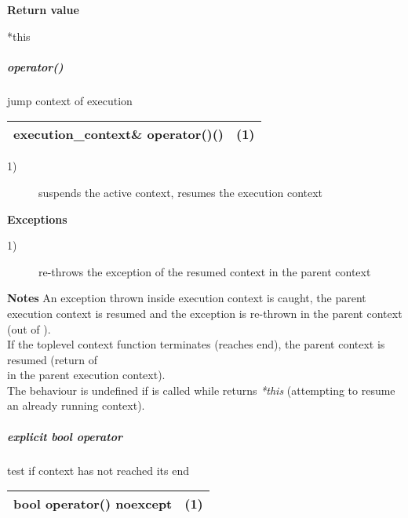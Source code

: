{\bfseries Return value}
\begin{description}
    \item[*this]
\end{description}

\subparagraph*{operator()}
jump context of execution\\

\begin{tabular}{ l l }
    \midrule

    {\ttfamily\small\color{black}execution\_context\& {\color{blue}operator}()()} & (1)\\

    \midrule
\end{tabular}

\begin{description}
    \item[1)] suspends the active context, resumes the execution context\\
\end{description}

{\bfseries Exceptions}
\begin{description}
    \item[1)] re-throws the exception of the resumed context in the parent context\\
\end{description}

{\bfseries Notes}
\newline
An exception thrown inside execution context is caught, the parent execution
context is resumed and the exception is re-thrown in the parent context (out of
\ectxop).\\
If the toplevel context function terminates (reaches end), the parent context is
resumed (return of\\
\ectxop in the parent execution context).\\
The behaviour is undefined if  is called while 
returns \emph{*this} (attempting to resume an already running context).

\subparagraph*{explicit bool operator}
test if context has not reached its end\\

\begin{tabular}{ l l }
    \midrule

    {\ttfamily\small\color{black}{\color{blue}explicit} {\color{blue}bool} {\color{blue}operator}() {\color{blue}noexcept}} & (1)\\

    \midrule
\end{tabular}


